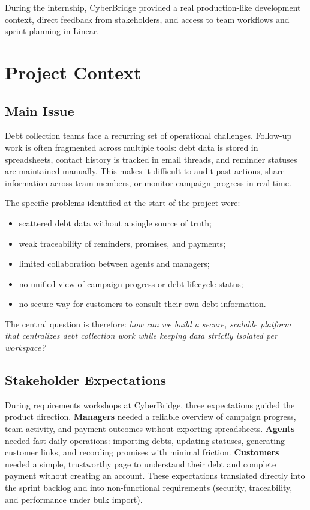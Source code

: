 \documentclass[12pt,a4paper]{report}
\begin{document}
During the internship, CyberBridge provided a real production-like development
context, direct feedback from stakeholders, and access to team workflows and sprint
planning in Linear.

\section{Project Context}

\subsection{Main Issue}

Debt collection teams face a recurring set of operational challenges.
Follow-up work is often fragmented across multiple tools: debt data is stored in
spreadsheets, contact history is tracked in email threads, and reminder statuses are
maintained manually.
This makes it difficult to audit past actions, share information across team members,
or monitor campaign progress in real time.

The specific problems identified at the start of the project were:
\begin{itemize}
  \item scattered debt data without a single source of truth;
  \item weak traceability of reminders, promises, and payments;
  \item limited collaboration between agents and managers;
  \item no unified view of campaign progress or debt lifecycle status;
  \item no secure way for customers to consult their own debt information.
\end{itemize}

The central question is therefore: \emph{how can we build a secure, scalable platform
that centralizes debt collection work while keeping data strictly isolated per
workspace?}

\subsection{Stakeholder Expectations}

During requirements workshops at CyberBridge, three expectations guided the product
direction.
\textbf{Managers} needed a reliable overview of campaign progress, team activity, and
payment outcomes without exporting spreadsheets.
\textbf{Agents} needed fast daily operations: importing debts, updating statuses,
generating customer links, and recording promises with minimal friction.
\textbf{Customers} needed a simple, trustworthy page to understand their debt and
complete payment without creating an account.
These expectations translated directly into the sprint backlog and into non-functional
requirements (security, traceability, and performance under bulk import).
\end{document}
